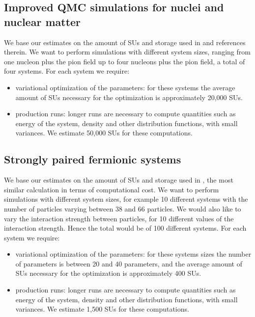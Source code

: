 \documentclass[12pt,letterpaper]{article}
\begin{document}
\subsection{Improved QMC simulations for nuclei and nuclear matter}

We base our estimates on the amount of SUs and storage used in \cite{car15} 
and references therein. We want to perform simulations with different system 
sizes, ranging from one nucleon plus the pion field up to four nucleons plus 
the pion field, a total of four systems. For each system we require:
\begin{itemize}
	\item variational optimization of the parameters: for these systems the 
	average amount of SUs necessary for the optimization is approximately 
	20,000 SUs.
	\item production runs: longer runs are necessary to compute quantities 
	such as energy of the system, density and other distribution functions, 
	with small variances. We estimate 50,000 SUs for these computations.
\end{itemize}

\subsection{Strongly paired fermionic systems}

We base our estimates on the amount of SUs and storage used in \cite{mad15}, 
the most similar calculation in terms of computational cost. We want to 
perform simulations with different system sizes, for example 10 different 
systems with the number of particles varying between 38 and 66 particles. We 
would also like to vary the interaction strength between particles, for 10 
different values of the interaction strength. Hence the total would be of 
100 different systems. For each system we require:
\begin{itemize}
	\item variational optimization of the parameters: for these systems 
	sizes the number of parameters is between 20 and 40 parameters, and the 
	average amount of SUs necessary for the optimization is approximately 
	400 SUs.
	\item production runs: longer runs are necessary to compute quantities 
	such as energy of the system, density and other distribution functions, 
	with small variances. We estimate 1,500 SUs for these computations.
\end{itemize}
\end{document}
